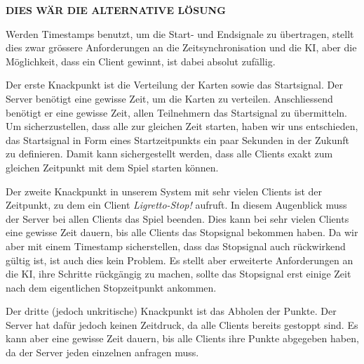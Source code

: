 \color{red}
\textbf{DIES WÄR DIE ALTERNATIVE LÖSUNG}
\color{black}

Werden Timestamps benutzt, um die Start- und Endsignale zu übertragen, stellt dies zwar grössere Anforderungen an die Zeitsynchronisation und die KI, aber die Möglichkeit, dass ein Client gewinnt, ist dabei absolut zufällig.

Der erste Knackpunkt ist die Verteilung der Karten sowie das Startsignal. Der Server benötigt eine gewisse Zeit, um die Karten zu verteilen. Anschliessend benötigt er eine gewisse Zeit, allen Teilnehmern das Startsignal zu übermitteln. Um sicherzustellen, dass alle zur gleichen Zeit starten, haben wir uns entschieden, das Startsignal in Form eines Startzeitpunkts ein paar Sekunden in der Zukunft zu definieren. Damit kann sichergestellt werden, dass alle Clients exakt zum gleichen Zeitpunkt mit dem Spiel starten können.


Der zweite Knackpunkt in unserem System mit sehr vielen Clients ist der Zeitpunkt, zu dem ein Client \textit{Ligretto-Stop!} aufruft. In diesem Augenblick muss der Server bei allen Clients das Spiel beenden. Dies kann bei sehr vielen Clients eine gewisse Zeit dauern, bis alle Clients das Stopsignal bekommen haben. Da wir aber mit einem Timestamp sicherstellen, dass das Stopsignal auch rückwirkend gültig ist, ist auch dies kein Problem. Es stellt aber erweiterte Anforderungen an die KI, ihre Schritte rückgängig zu machen, sollte das Stopsignal erst einige Zeit nach dem eigentlichen Stopzeitpunkt ankommen.

Der dritte (jedoch unkritische) Knackpunkt ist das Abholen der Punkte. Der Server hat dafür jedoch keinen Zeitdruck, da alle Clients bereits gestoppt sind. Es kann aber eine gewisse Zeit dauern, bis alle Clients ihre Punkte abgegeben haben, da der Server jeden einzelnen anfragen muss.


